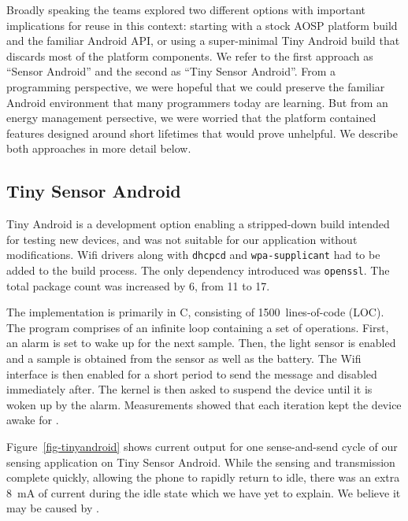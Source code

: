 
Broadly speaking the teams explored two different options with important
implications for reuse in this context: starting with a stock AOSP platform
build and the familiar Android API, or using a super-minimal Tiny Android
build that discards most of the platform components. We refer to the first
approach as ``Sensor Android'' and the second as ``Tiny Sensor Android''.
From a programming perspective, we were hopeful that we could preserve the
familiar Android environment that many programmers today are learning. But
from an energy management persective, we were worried that the platform
contained features designed around short lifetimes that would prove
unhelpful. We describe both approaches in more detail below.

\subsection{Tiny Sensor Android}
\label{subsec-tiny}

Tiny Android is a development option enabling a stripped-down build intended
for testing new devices, and was not suitable for our application without
modifications. Wifi drivers along with \texttt{dhcpcd} and
\texttt{wpa-supplicant} had to be added to the build process. The only
dependency introduced was \texttt{openssl}. The total package count was
increased by 6, from 11 to 17.

The implementation is primarily in C, consisting of 1500~lines-of-code
(LOC). The program comprises of an infinite loop containing a set of operations. 
First, an alarm is set to wake up for the next sample. Then, the light
sensor is enabled and a sample is obtained from the sensor as well as the
battery. The Wifi interface is then enabled for a short period to send the
message and disabled immediately after. The kernel is then asked to suspend the
device until it is woken up by the alarm.
Measurements showed that each iteration kept the device awake for .

Figure~\ref{fig-tinyandroid} shows current output for one sense-and-send
cycle of our sensing application on Tiny Sensor Android. While the sensing
and transmission complete quickly, allowing the phone to rapidly return to
idle, there was an extra 8~mA of current during the idle state which we have
yet to explain. We believe it may be caused by .

